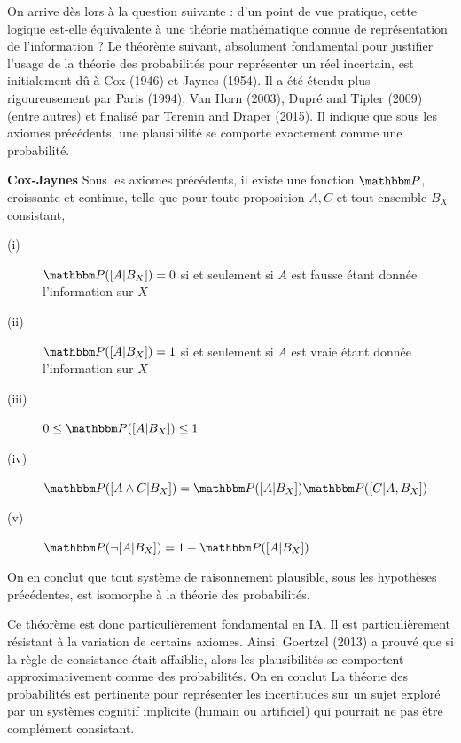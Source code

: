 On arrive dès lors à la question suivante : d'un point de vue pratique, cette logique est-elle équivalente à une théorie mathématique connue de représentation de l'information ? Le théorème suivant, absolument fondamental pour justifier l'usage de la théorie des probabilités pour représenter un réel incertain, est initialement dû à Cox (1946) et Jaynes (1954). Il a été étendu plus rigoureusement par Paris (1994), Van Horn (2003), Dupré and Tipler (2009) (entre autres) et finalisé par Terenin and Draper (2015). Il indique que sous les axiomes précédents, une plausibilité se comporte exactement comme une probabilité. \\

\begin{theorem}{\bf Cox-Jaynes}
Sous les axiomes précédents, il existe une fonction $\Pp$, croissante et continue, telle que pour  toute proposition $A,C$ et tout ensemble $B_X$ consistant,
\begin{description}
\item[(i)] $\Pp([A|B_X])=0$ si et seulement si $A$ est fausse étant donnée l'information sur $X$
\item[(ii)] $\Pp([A|B_X])=1$ si et seulement si $A$ est vraie étant donnée l'information sur $X$  
\item[(iii)] $0\leq \Pp([A|B_X]) \leq 1$ 
\item[(iv)] $\Pp([A \land C|B_X])=\Pp([A |B_X])\Pp([C |A,B_X])$
\item[(v)] $\Pp(\neg [A|B_X]) = 1 - \Pp([A|B_X])$
\end{description} 
On en conclut que tout système de raisonnement plausible, sous les hypothèses précédentes, est isomorphe à la théorie des probabilités. 
\end{theorem}

Ce théorème est donc particulièrement fondamental en IA. Il est particulièrement résistant à la variation de certains axiomes. Ainsi, Goertzel (2013) a prouvé que si la règle de consistance était affaiblie, alors les plausibilités se comportent approximativement comme des probabilités. On en conclut La théorie des probabilités est pertinente pour représenter les incertitudes sur un sujet exploré par un systèmes cognitif implicite (humain ou artificiel) qui pourrait ne pas être complément consistant. \\

